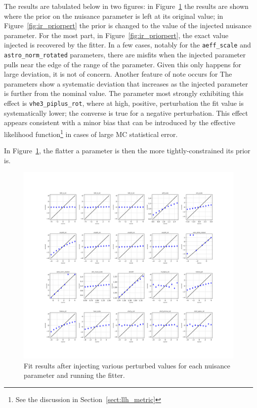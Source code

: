 \documentclass[main.tex]{subfiles}
\begin{document}
The results are tabulated below in two figures: in Figure~\ref{fig:ir_nopriorpert} the results are shown where the prior on the nuisance parameter is left at its original value; in Figure~\ref{fig:ir_priorpert} the prior is changed to the value of the injected nuisance parameter. 
For the most part, in Figure~\ref{fig:ir_priorpert}, the exact value injected is recovered by the fitter. 
In a few cases, notably for the \texttt{aeff\_scale} and \texttt{astro\_norm\_rotated} parameters, there are misfits when the injected parameter pulls near the edge of the range of the parameter.
Given this only happens for large deviation, it is not of concern. 
Another feature of note occurs for
The parameters show a systematic deviation that increases as the injected parameter is further from the nominal value. 
The parameter most strongly exhibiting this effect is \texttt{vhe3\_piplus\_rot}, where at high, positive, perturbation the fit value is systematically lower; the converse is true for a negative perturbation. 
This effect appears consistent with a minor bias that can be introduced by the effective likelihood function\footnote{See the discussion in Section~\ref{sect:llh_metric}} in cases of large MC statistical error.  

In Figure~\ref{fig:ir_nopriorpert}, the flatter a parameter is then the more tightly-constrained its prior is. 

\begin{figure}
    \centering 
    \includegraphics[width=0.7\linewidth]{figures/inject_recover_syst.png}
    \caption{Fit results after injecting various perturbed values for each nuisance parameter and running the fitter. }\label{fig:ir_nopriorpert}
\end{figure}
\end{document}
